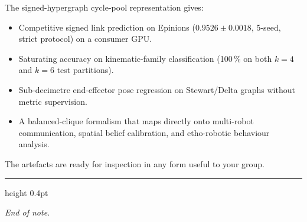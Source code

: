 \documentclass[11pt,a4paper]{article}
\newcommand{\pmval}[2]{\ensuremath{#1 \pm #2}}
\begin{document}
The signed-hypergraph cycle-pool representation gives:
\begin{itemize}
  \item Competitive signed link prediction on Epinions
    (\pmval{0.9526}{0.0018}, 5-seed, strict protocol) on a
    consumer GPU.
  \item Saturating accuracy on kinematic-family classification (100\,\%
    on both $k = 4$ and $k = 6$ test partitions).
  \item Sub-decimetre end-effector pose regression on Stewart/Delta
    graphs without metric supervision.
  \item A balanced-clique formalism that maps directly onto
    multi-robot communication, spatial belief calibration, and
    etho-robotic behaviour analysis.
\end{itemize}

The artefacts are ready for inspection in any form useful to your
group.

\vspace{0.5em}
\hrule height 0.4pt
\vspace{0.4em}

\noindent\textit{End of note.}
\end{document}
